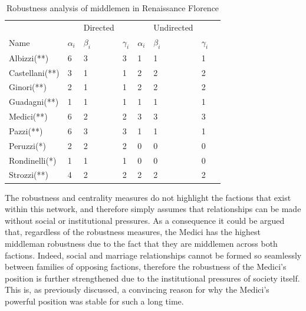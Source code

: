 \begin{table}[]
\centering
\begin{tabu} to \textwidth {X[l]  X[c]  X[c]  X[c] || X[c]  X[c]  X[c]  X[c]} 
\hline \hline
               &              & Directed    &              &              & Undirected  &              \\
Name           & $\alpha_{i}$ & $\beta_{i}$ & $\gamma_{i}$ & $\alpha_{i}$ & $\beta_{i}$ & $\gamma_{i}$ \\ \hline
Albizzi(**)    & 6            & 3           & 3            & 1            & 1           & 1            \\
Castellani(**) & 3            & 1           & 1            & 2            & 2           & 2            \\
Ginori(**)     & 2            & 1           & 1            & 2            & 2           & 2            \\
Guadagni(**)   & 1            & 1           & 1            & 1            & 1           & 1            \\
Medici(**)     & 6            & 2           & 2            & 3            & 3           & 3            \\
Pazzi(**)      & 6            & 3           & 3            & 1            & 1           & 1            \\
Peruzzi(*)     & 2            & 2           & 2            & 0            & 0           & 0            \\
Rondinelli(*)  & 1            & 1           & 1            & 0            & 0           & 0            \\
Strozzi(**)    & 4            & 2           & 2            & 2            & 2           & 2            \\ \hline
\end{tabu}
\caption{Robustness analysis of middlemen in Renaissance Florence}
\label{FlorenceRobust}
\end{table}

The robustness and centrality measures do not highlight the factions that exist within this network, and therefore simply assumes that relationships can be made without social or institutional pressures. As a consequence it could be argued that, regardless of the robustness measures, the Medici has the highest middleman robustness due to the fact that they are middlemen across both factions. Indeed, social and marriage relationships cannot be formed so seamlessly between families of opposing factions, therefore the robustness of the Medici's position is further strengthened due to the institutional pressures of society itself. This is, as previously discussed, a convincing reason for why the Medici's powerful position was stable for such a long time.

